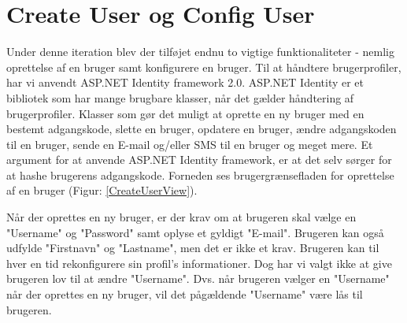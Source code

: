 \section{Create User og Config User}

Under denne iteration blev der tilføjet endnu to vigtige funktionaliteter - nemlig oprettelse af en bruger samt konfigurere en bruger. Til at håndtere brugerprofiler, har vi anvendt ASP.NET Identity framework 2.0. ASP.NET Identity er et bibliotek som har mange brugbare klasser, når det gælder håndtering af brugerprofiler. Klasser som gør det muligt at oprette en ny bruger med en bestemt adgangskode, slette en bruger, opdatere en bruger, ændre adgangskoden til en bruger, sende en E-mail og/eller SMS til en bruger og meget mere. Et argument for at anvende ASP.NET Identity framework, er at det selv sørger for at hashe brugerens adgangskode. 
Forneden ses brugergrænsefladen for oprettelse af en bruger (Figur: \ref{CreateUserView}). 


Når der oprettes en ny bruger, er der krav om at brugeren skal vælge en "Username" og "Password" samt oplyse et gyldigt "E-mail". Brugeren kan også udfylde "Firstnavn" og "Lastname", men det er ikke et krav. Brugeren kan til hver en tid rekonfigurere sin profil's informationer. Dog har vi valgt ikke at give brugeren lov til at ændre "Username". Dvs. når brugeren vælger en "Username" når der oprettes en ny bruger, vil det pågældende "Username" være lås til brugeren. 
